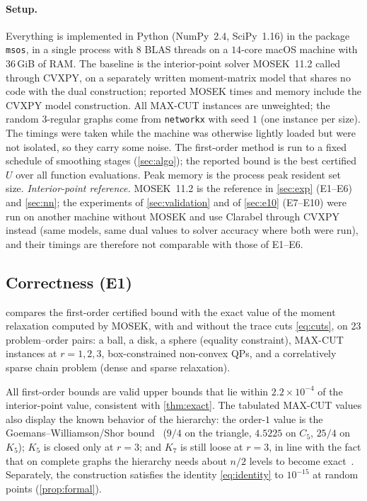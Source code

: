 \documentclass[a4paper,11pt]{article}
\newcommand{\fitbox}[1]{\sbox{\tabbox}{#1}\ifdim\wd\tabbox>\textwidth\resizebox{\textwidth}{!}{\usebox{\tabbox}}\else\usebox{\tabbox}\fi}
\theoremstyle{plain}
\theoremstyle{definition}
\theoremstyle{remark}
\begin{document}
\paragraph{Setup.} Everything is implemented in Python (NumPy~2.4, SciPy~1.16) in the package \texttt{msos}, in a single process with $8$ BLAS threads on a $14$-core macOS machine with $36$\,GiB of RAM. The baseline is the interior-point solver MOSEK~11.2 called through CVXPY, on a separately written moment-matrix model that shares no code with the dual construction; reported MOSEK times and memory include the CVXPY model construction. All MAX-CUT instances are unweighted; the random $3$-regular graphs come from \texttt{networkx} with seed $1$ (one instance per size). The timings were taken while the machine was otherwise lightly loaded but were not isolated, so they carry some noise. The first-order method is run to a fixed schedule of smoothing stages (\cref{sec:algo}); the reported bound is the best certified $U$ over all function evaluations. Peak memory is the process peak resident set size. \emph{Interior-point reference.} MOSEK~11.2 is the reference in \cref{sec:exp} (E1--E6) and \cref{sec:nn}; the experiments of \cref{sec:validation} and of \cref{sec:e10} (E7--E10) were run on another machine without MOSEK and use Clarabel through CVXPY instead (same models, same dual values to solver accuracy where both were run), and their timings are therefore not comparable with those of E1--E6.

\subsection{Correctness (E1)}
 compares the first-order certified bound with the exact value of the moment relaxation computed by MOSEK, with and without the trace cuts \eqref{eq:cuts}, on 23 problem--order pairs: a ball, a disk, a sphere (equality constraint), MAX-CUT instances at $r=1,2,3$, box-constrained non-convex QPs, and a correlatively sparse chain problem (dense and sparse relaxation).
\begin{table}[t]\centering\scriptsize
\fitbox{}
\caption{Certified first-order bound versus MOSEK. In every row the bound is $\ge$ the MOSEK value (as it must be) and the largest excess is $2.2\times10^{-4}$. The cuts \eqref{eq:cuts} never changed the optimal value, so the columns ``Lasserre'' and ``+ cuts'' coincide. $s$ is the moment-block size.}\label{tab:e1}
\end{table}
All first-order bounds are valid upper bounds that lie within $2.2\times10^{-4}$ of the interior-point value, consistent with \cref{thm:exact}. The tabulated MAX-CUT values also display the known behavior of the hierarchy: the order-$1$ value is the Goemans--Williamson/Shor bound~\cite{goemans1995} ($9/4$ on the triangle, $4.5225$ on $C_5$, $25/4$ on $K_5$); $K_5$ is closed only at $r=3$; and $K_7$ is still loose at $r=3$, in line with the fact that on complete graphs the hierarchy needs about $n/2$ levels to become exact~\cite{laurent2003}. Separately, the construction satisfies the identity \eqref{eq:identity} to $10^{-15}$ at random points (\cref{prop:formal}).
\end{document}
